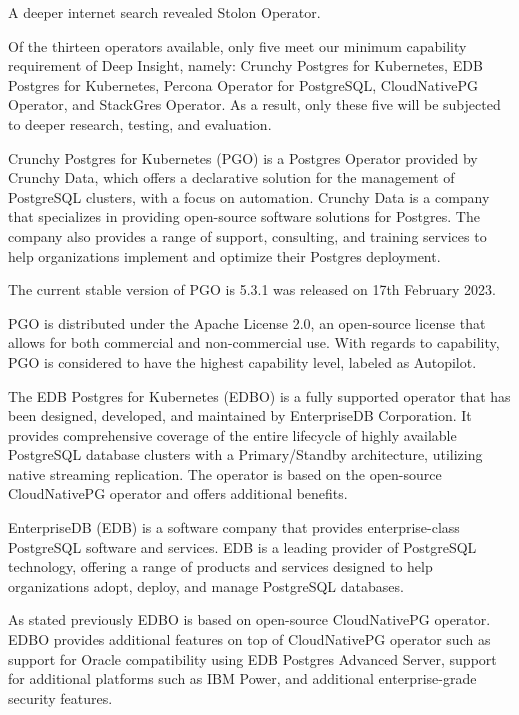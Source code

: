 A deeper internet search revealed Stolon Operator. \cite{PalarkComparingKubernetes}

Of the thirteen operators available, only five meet our minimum capability requirement of Deep Insight, namely: Crunchy Postgres for Kubernetes, EDB Postgres for Kubernetes, Percona Operator for PostgreSQL, CloudNativePG Operator, and StackGres Operator. As a result, only these five will be subjected to deeper research, testing, and evaluation.

\pagebreak
{}
Crunchy Postgres for Kubernetes (PGO) is a Postgres Operator provided by Crunchy Data, which offers a declarative solution for the management of PostgreSQL clusters, with a focus on automation.
Crunchy Data is a company that specializes in providing open-source software solutions for Postgres. The company also provides a range of support, consulting, and training services to help organizations implement and optimize their Postgres deployment. \cite{Crunchy}

The current stable version of PGO is 5.3.1 was released on 17th February 2023. \cite{CrunchyV531releaseNotes}

PGO is distributed under the Apache License 2.0, an open-source license that allows for both commercial and non-commercial use. With regards to capability, PGO is considered to have the highest capability level, labeled as Autopilot. \cite{OperatorHubCrunchy}

The EDB Postgres for Kubernetes (EDBO) is a fully supported operator that has been designed, developed, and maintained by EnterpriseDB Corporation. It provides comprehensive coverage of the entire lifecycle of highly available PostgreSQL database clusters with a Primary/Standby architecture, utilizing native streaming replication. The operator is based on the open-source CloudNativePG operator and offers additional benefits. \cite{OperatorHubEDB}

EnterpriseDB (EDB) is a software company that provides enterprise-class PostgreSQL software and services. EDB is a leading provider of PostgreSQL technology, offering a range of products and services designed to help organizations adopt, deploy, and manage PostgreSQL databases. \cite{EDB}

As stated previously EDBO is based on open-source CloudNativePG operator. EDBO provides additional features on top of CloudNativePG operator such as support for Oracle compatibility using EDB Postgres Advanced Server, support for additional platforms such as IBM Power, and additional enterprise-grade security features. \cite{EDBdocu}

